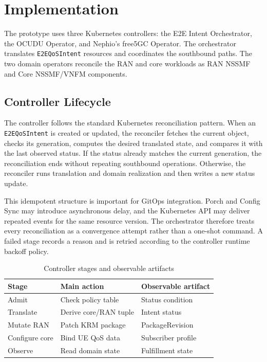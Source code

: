 ﻿\section{Implementation}
\label{sec:implementation}

The prototype uses three Kubernetes controllers: the E2E Intent Orchestrator, the OCUDU Operator, and Nephio's free5GC Operator. The orchestrator translates \texttt{E2EQoSIntent} resources and coordinates the southbound paths. The two domain operators reconcile the RAN and core workloads as RAN NSSMF and Core NSSMF/VNFM components.

\subsection{Controller Lifecycle}

The controller follows the standard Kubernetes reconciliation pattern. When an \texttt{E2EQoSIntent} is created or updated, the reconciler fetches the current object, checks its generation, computes the desired translated state, and compares it with the last observed status. If the status already matches the current generation, the reconciliation ends without repeating southbound operations. Otherwise, the reconciler runs translation and domain realization and then writes a new status update.

This idempotent structure is important for GitOps integration. Porch and Config Sync may introduce asynchronous delay, and the Kubernetes API may deliver repeated events for the same resource version. The orchestrator therefore treats every reconciliation as a convergence attempt rather than a one-shot command. A failed stage records a reason and is retried according to the controller runtime backoff policy.

\begin{table}[t]
  \caption{Controller stages and observable artifacts}
  \label{tab:controller_stages}
  \begin{tabular}{lll}
    \toprule
    Stage & Main action & Observable artifact \\
    \midrule
    Admit & Check policy table & Status condition \\
    Translate & Derive core/RAN tuple & Intent status \\
    Mutate RAN & Patch KRM package & PackageRevision \\
    Configure core & Bind UE QoS data & Subscriber profile \\
    Observe & Read domain state & Fulfillment state \\
    \bottomrule
  \end{tabular}
\end{table}

